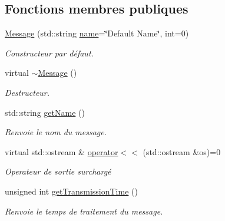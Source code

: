 \subsection*{Fonctions membres publiques}
\begin{DoxyCompactItemize}
\item 
\hypertarget{classMessage_a154809183fa5ec6b5182c487db1167dd}{\hyperlink{classMessage_a154809183fa5ec6b5182c487db1167dd}{Message} (std\-::string \hyperlink{classMessage_ac7adddb666acdc47c48f684bd6810a51}{name}=\char`\"{}Default Name\char`\"{}, int=0)}\label{classMessage_a154809183fa5ec6b5182c487db1167dd}

\begin{DoxyCompactList}\small\item\em Constructeur par défaut. \end{DoxyCompactList}\item 
\hypertarget{classMessage_a3f7275462831f787a861271687bcad67}{virtual \hyperlink{classMessage_a3f7275462831f787a861271687bcad67}{$\sim$\-Message} ()}\label{classMessage_a3f7275462831f787a861271687bcad67}

\begin{DoxyCompactList}\small\item\em Destructeur. \end{DoxyCompactList}\item 
\hypertarget{classMessage_ac03b02000572b0852c574498bf138e87}{std\-::string \hyperlink{classMessage_ac03b02000572b0852c574498bf138e87}{get\-Name} ()}\label{classMessage_ac03b02000572b0852c574498bf138e87}

\begin{DoxyCompactList}\small\item\em Renvoie le nom du message. \end{DoxyCompactList}\item 
\hypertarget{classMessage_acbdab136245666bce3752fa311150672}{virtual std\-::ostream \& \hyperlink{classMessage_acbdab136245666bce3752fa311150672}{operator$<$$<$} (std\-::ostream \&os)=0}\label{classMessage_acbdab136245666bce3752fa311150672}

\begin{DoxyCompactList}\small\item\em Operateur de sortie surchargé \end{DoxyCompactList}\item 
\hypertarget{classMessage_a37550fee6e64d7c83ead2628373f4db3}{unsigned int \hyperlink{classMessage_a37550fee6e64d7c83ead2628373f4db3}{get\-Transmission\-Time} ()}\label{classMessage_a37550fee6e64d7c83ead2628373f4db3}

\begin{DoxyCompactList}\small\item\em Renvoie le temps de traitement du message. \end{DoxyCompactList}\end{DoxyCompactItemize}
